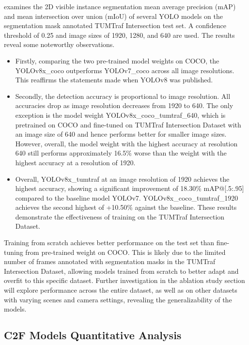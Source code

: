  examines the 2D visible instance segmentation mean average precision (mAP) and mean intersection over union (mIoU) of several YOLO models on the segmentation mask annotated TUMTraf Intersection test set. A confidence threshold of 0.25 and image sizes of 1920, 1280, and 640 are used. The results reveal some noteworthy observations.
\begin{itemize}
	\item Firstly, comparing the two pre-trained model weights on COCO, the YOLOv8x\_coco outperforms YOLOv7\_coco across all image resolutions. This reaffirms the statements made when YOLOv8 was published.
	\item Secondly, the detection accuracy is proportional to image resolution. All accuracies drop as image resolution decreases from 1920 to 640. The only exception is the model weight YOLOv8x\_coco\_tumtraf\_640, which is pretrained on COCO and fine-tuned on TUMTraf Intersection Dataset with an image size of 640 and hence performs better for smaller image sizes. However, overall, the model weight with the highest accuracy at resolution 640 still performs approximately 16.5\% worse than the weight with the highest accuracy at a resolution of 1920. 
	\item Overall, YOLOv8x\_tumtraf at an image resolution of 1920 achieves the highest accuracy, showing a significant improvement of 18.30\% mAP@[.5:.95] compared to the baseline model YOLOv7. YOLOv8x\_coco\_tumtraf\_1920 achieves the second highest of +10.50\% against the baseline. These results demonstrate the effectiveness of training on the TUMTraf Intersection Dataset.
\end{itemize}

Training from scratch achieves better performance on the test set than fine-tuning from pre-trained weight on COCO. This is likely due to the limited number of frames annotated with segmentation masks in the TUMTraf Intersection Dataset, allowing models trained from scratch to better adapt and overfit to this specific dataset. Further investigation in the ablation study section will explore performance across the entire dataset, as well as on other datasets with varying scenes and camera settings, revealing the generalizability of the models.

\subsection{C2F Models Quantitative Analysis}

